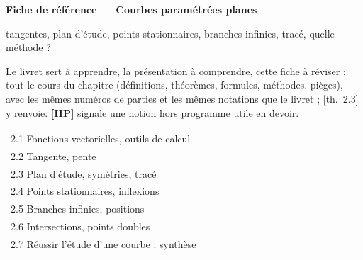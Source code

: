 \documentclass[a4paper,10pt]{article}
\newcommand{\HP}{{\sffamily\bfseries\scriptsize\textcolor{Brique}{[HP]}}}
\newcommand{\livre}[1]{{\sffamily\scriptsize\color{Gris}[#1]}}
\begin{document}
\thispagestyle{empty}
\noindent\colorbox{Bleu}{\parbox{\dimexpr\linewidth-2\fboxsep}{\vspace{0.4em}
{\color{white}\sffamily\scriptsize{}}\par\smallskip
{\color{white}\sffamily\bfseries\LARGE Fiche de référence --- Courbes paramétrées planes}\par\smallskip
{\color{white!85!Bleu}\sffamily tangentes, plan d'étude, points stationnaires, branches infinies, tracé, quelle méthode ?}\vspace{0.4em}}}

\vspace{0.6em}
{\small Le livret sert à apprendre, la présentation à comprendre, cette fiche à réviser : tout le cours du chapitre (définitions, théorèmes, formules, méthodes, pièges), avec les mêmes numéros de parties et les mêmes notations que le livret ; \livre{th.~2.3} y renvoie. \HP{} signale une notion hors programme utile en devoir.}

\vspace{0.4em}
{\small\sffamily\noindent\begin{tabular}{@{}p{0.6\linewidth}@{}}
2.1 Fonctions vectorielles, outils de calcul \dotfill\pageref{n21}\\
2.2 Tangente, pente \dotfill\pageref{n22}\\
2.3 Plan d'étude, symétries, tracé \dotfill\pageref{n23}\\
2.4 Points stationnaires, inflexions \dotfill\pageref{n24}\\
2.5 Branches infinies, positions \dotfill\pageref{n25}\\
2.6 Intersections, points doubles \dotfill\pageref{n26}\\
2.7 Réussir l'étude d'une courbe : synthèse \dotfill\pageref{n27}\\
\end{tabular}}
\end{document}
